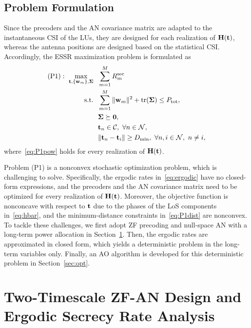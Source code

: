 \documentclass[journal]{IEEEtran}
\begin{document}
\subsection{Problem Formulation}

Since the precoders and the AN covariance matrix are adapted to the instantaneous CSI of the LUs, they are designed for each realization of $\mathbf{H}(\mathbf{t})$, whereas the antenna positions are designed based on the statistical CSI. Accordingly, the ESSR maximization problem is formulated as
\begin{subequations}\label{eq:P1}
\begin{align}
(\mathrm{P1}):\ \max_{\mathbf{t},\{\mathbf{w}_m\},\boldsymbol{\Sigma}}\ \ & \sum_{m=1}^{M}R_m^{\mathrm{sec}}\label{eq:P1obj}\\
\mathrm{s.t.}\ \ & \sum_{m=1}^M\|\mathbf{w}_m\|^2+\mathrm{tr}(\boldsymbol{\Sigma})\le P_{\mathrm{tot}},\nonumber\\
& \boldsymbol{\Sigma}\succeq\mathbf 0,\label{eq:P1pow}\\
& \mathbf{t}_n\in\mathcal C,\ \forall n\in\mathcal N,\label{eq:P1region}\\
& \|\mathbf{t}_n-\mathbf{t}_i\|\ge D_{\min},\ \forall n,i\in\mathcal N,\ n\neq i,\label{eq:P1dist}
\end{align}
\end{subequations}
where~\eqref{eq:P1pow} holds for every realization of $\mathbf{H}(\mathbf{t})$.

Problem (P1) is a nonconvex stochastic optimization problem, which is challenging to solve. Specifically, the ergodic rates in~\eqref{eq:ergodic} have no closed-form expressions, and the precoders and the AN covariance matrix need to be optimized for every realization of $\mathbf{H}(\mathbf{t})$. Moreover, the objective function is nonconcave with respect to $\mathbf{t}$ due to the phases of the LoS components in~\eqref{eq:hbar}, and the minimum-distance constraints in~\eqref{eq:P1dist} are nonconvex. To tackle these challenges, we first adopt ZF precoding and null-space AN with a long-term power allocation in Section~\ref{sec:analysis}. Then, the ergodic rates are approximated in closed form, which yields a deterministic problem in the long-term variables only. Finally, an AO algorithm is developed for this deterministic problem in Section~\ref{sec:opt}.

\section{Two-Timescale ZF-AN Design and Ergodic Secrecy Rate Analysis}\label{sec:analysis}
\end{document}
